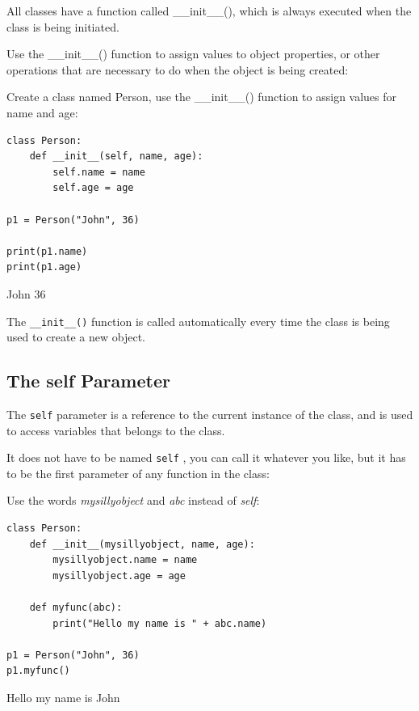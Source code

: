 \documentclass[12pt,a4paper]{article}
\newcommand{\code}[1]{%
	\colorbox{backcolour}{\lstinline{#1}}%
}
\newcommand{\lcode}[1]{%
	\lstinline{#1}%
}
\begin{document}
All classes have a function called \_\_init\_\_(), which is always executed
when the class is being initiated.

Use the \_\_init\_\_() function to assign values to object properties, or other
operations that are necessary to do when the object is being created:

\begin{ebox}
Create a class named Person, use the \_\_init\_\_() function to assign values for
name and age:
	\begin{lstlisting}
class Person:
    def __init__(self, name, age):
        self.name = name
        self.age = age

p1 = Person("John", 36)

print(p1.name)
print(p1.age)
	\end{lstlisting}
\tcblower
	\begin{vercode}
John
36
	\end{vercode}
\end{ebox}

\begin{nbox}
The \lcode{__init__()} function is called automatically every time the
class is being used to create a new object.
\end{nbox}
\subsection{The self Parameter}

The \code{self} parameter is a reference to the current instance of the class,
and is used to access variables that belongs to the class.

It does not have to be named \code{self} , you can call it whatever you like,
but it has to be the first parameter of any function in the class:

\begin{ebox}
Use the words \textit{mysillyobject} and \textit{abc} instead of \textit{self}:
	\begin{lstlisting}
class Person:
    def __init__(mysillyobject, name, age):
        mysillyobject.name = name
        mysillyobject.age = age

    def myfunc(abc):
        print("Hello my name is " + abc.name)

p1 = Person("John", 36)
p1.myfunc()
	\end{lstlisting}
\tcblower
	\begin{vercode}
Hello my name is John
	\end{vercode}
\end{ebox}
\end{document}
